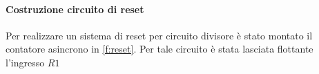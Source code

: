  	\paragraph{Costruzione circuito di reset}
 	Per realizzare un sistema di reset per circuito divisore 
 	è stato montato il contatore asincrono in \figurename{  \ref{f:reset}}.
 	Per tale circuito è stata lasciata flottante l'ingresso $R1$